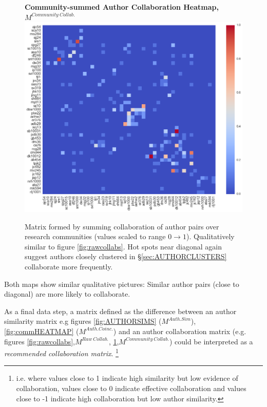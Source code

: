   \begin{figure}[H]
  \centering
  \textbf{Community-summed Author Collaboration Heatmap, $M^{Community\ Collab.}$}
    \includegraphics[width=\textwidth]{Analysis/comm_collabs.png}
    \caption[Community-summed Author Collaboration Heatmap]{Matrix formed by summing collaboration of author pairs over research communities (values scaled to range $0 \rightarrow 1$). Qualitatively similar to figure \ref{fig:rawcollabs}. Hot spots near diagonal again suggest authors closely clustered in \S\ref{sec:AUTHORCLUSTERS} collaborate more frequently.}
      \label{fig:collcollabs}
\end{figure}
Both maps show similar qualitative pictures: Similar author pairs (close to diagonal) are more likely to collaborate. 

As a final data step, a matrix defined as the difference between an author similarity matrix e.g figures \ref{fig:AUTHORSIMS} ($M^{Auth. Sim}$), \ref{fig:commHEATMAP} ($M^{Auth. Coinc.}$) and an author collaboration matrix (e.g. figures \ref{fig:rawcollabs},$M^{Raw\ Collab.}$, \ref{fig:collcollabs},$M^{Community\ Collab.}$) could be interpreted as a \emph{recommended collaboration matrix}. \footnote{i.e. where values close to 1 indicate high similarity but low evidence of collaboration, values close to 0 indicate effective collaboration and values close to -1 indicate high collaboration but low author similarity.} 

